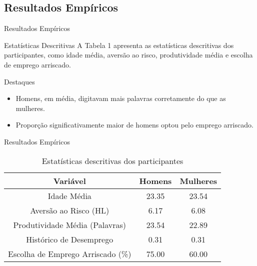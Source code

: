 \documentclass[aspectratio=169, xcolor={dvipsnames}, 10pt, brazil]{beamer}
\begin{document}
\subsection{Resultados Empíricos}
\begin{frame}{Resultados Empíricos}

    \begin{block}{Estatísticas Descritivas}
        A Tabela 1 apresenta as estatísticas descritivas dos participantes, como idade média, aversão ao risco, produtividade média e escolha de emprego arriscado.
    \end{block}

    \begin{block}{Destaques}
        \begin{itemize}
            \item Homens, em média, digitavam mais palavras corretamente do que as mulheres.
            \item Proporção significativamente maior de homens optou pelo emprego arriscado.
        \end{itemize}
    \end{block}
\end{frame}

\begin{frame}{Resultados Empíricos}
\begin{table}[h!]
         \centering
         \caption{Estatísticas descritivas dos participantes}
         \begin{tabular}{|c|c|c|}
             \hline
             Variável & Homens & Mulheres \\ \hline
             Idade Média & 23.35 & 23.54 \\ \hline
             Aversão ao Risco (HL) & 6.17 & 6.08 \\ \hline
             Produtividade Média (Palavras) & 23.54 & 22.89 \\ \hline
             Histórico de Desemprego & 0.31 & 0.31 \\ \hline
             Escolha de Emprego Arriscado (\%) & 75.00 & 60.00 \\ \hline
         \end{tabular}
\end{table}

\end{frame}

\end{document}
